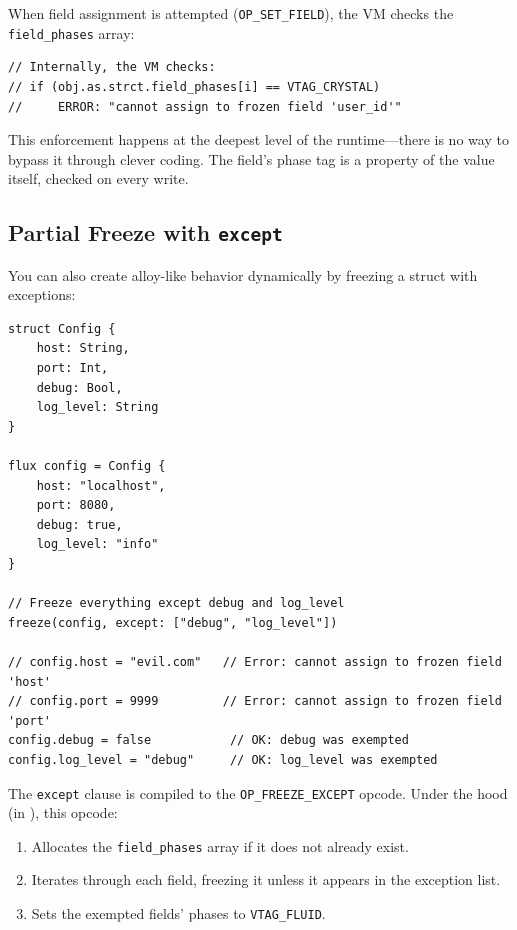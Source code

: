 When field assignment is attempted (\lstinline|OP_SET_FIELD|), the VM checks the \lstinline|field_phases| array:

\begin{lstlisting}[language=Lattice, caption={Field-level phase enforcement}]
// Internally, the VM checks:
// if (obj.as.strct.field_phases[i] == VTAG_CRYSTAL)
//     ERROR: "cannot assign to frozen field 'user_id'"
\end{lstlisting}

This enforcement happens at the deepest level of the runtime---there is no way to bypass it through clever coding.
The field's phase tag is a property of the value itself, checked on every write.

\subsection{Partial Freeze with \texttt{except}}


You can also create alloy-like behavior dynamically by freezing a struct with exceptions:

\begin{lstlisting}[language=Lattice, caption={Freezing a struct with exceptions}]
struct Config {
    host: String,
    port: Int,
    debug: Bool,
    log_level: String
}

flux config = Config {
    host: "localhost",
    port: 8080,
    debug: true,
    log_level: "info"
}

// Freeze everything except debug and log_level
freeze(config, except: ["debug", "log_level"])

// config.host = "evil.com"   // Error: cannot assign to frozen field 'host'
// config.port = 9999         // Error: cannot assign to frozen field 'port'
config.debug = false           // OK: debug was exempted
config.log_level = "debug"     // OK: log_level was exempted
\end{lstlisting}

The \lstinline|except| clause is compiled to the \lstinline|OP_FREEZE_EXCEPT| opcode.
Under the hood (in ), this opcode:

\begin{enumerate}
  \item Allocates the \lstinline|field_phases| array if it does not already exist.
  \item Iterates through each field, freezing it unless it appears in the exception list.
  \item Sets the exempted fields' phases to \lstinline|VTAG_FLUID|.
\end{enumerate}

